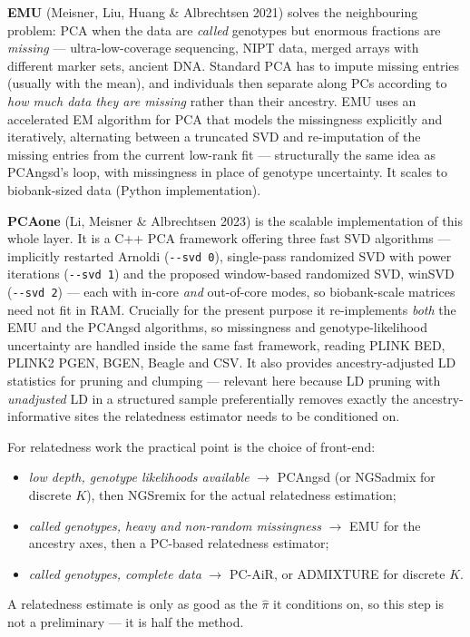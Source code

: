 \documentclass[10pt,a4paper]{article}
\newenvironment{tightitem}{%
  \begin{itemize}\setlength{\itemsep}{1pt}\setlength{\parskip}{0pt}%
  \setlength{\topsep}{3pt}\setlength{\parsep}{0pt}}{\end{itemize}}
\begin{document}
\textbf{EMU} (Meisner, Liu, Huang \& Albrechtsen 2021) solves the neighbouring problem: PCA when the data are
\emph{called} genotypes but enormous fractions are \emph{missing} --- ultra-low-coverage sequencing, NIPT
data, merged arrays with different marker sets, ancient DNA. Standard PCA has to impute missing entries
(usually with the mean), and individuals then separate along PCs according to \emph{how much data they are
missing} rather than their ancestry. EMU uses an accelerated EM algorithm for PCA that models the
missingness explicitly and iteratively, alternating between a truncated SVD and re-imputation of the missing
entries from the current low-rank fit --- structurally the same idea as PCAngsd's loop, with missingness in
place of genotype uncertainty. It scales to biobank-sized data (Python implementation).

\textbf{PCAone} (Li, Meisner \& Albrechtsen 2023) is the scalable implementation of this whole layer. It is a
C++ PCA framework offering three fast SVD algorithms --- implicitly restarted Arnoldi (\texttt{-{}-svd 0}),
single-pass randomized SVD with power iterations (\texttt{-{}-svd 1}) and the proposed window-based
randomized SVD, winSVD (\texttt{-{}-svd 2}) --- each with in-core \emph{and} out-of-core modes, so biobank-scale
matrices need not fit in RAM. Crucially for the present purpose it re-implements \emph{both} the EMU and the
PCAngsd algorithms, so missingness and genotype-likelihood uncertainty are handled inside the same fast
framework, reading PLINK BED, PLINK2 PGEN, BGEN, Beagle and CSV. It also provides ancestry-adjusted LD
statistics for pruning and clumping --- relevant here because LD pruning with \emph{unadjusted} LD in a
structured sample preferentially removes exactly the ancestry-informative sites the relatedness estimator
needs to be conditioned on.

For relatedness work the practical point is the choice of front-end:
\begin{tightitem}
  \item \emph{low depth, genotype likelihoods available} $\rightarrow$ PCAngsd (or NGSadmix for discrete $K$),
  then NGSremix for the actual relatedness estimation;
  \item \emph{called genotypes, heavy and non-random missingness} $\rightarrow$ EMU for the ancestry axes,
  then a PC-based relatedness estimator;
  \item \emph{called genotypes, complete data} $\rightarrow$ PC-AiR, or ADMIXTURE for discrete $K$.
\end{tightitem}
A relatedness estimate is only as good as the $\hat\pi$ it conditions on, so this step is not a preliminary
--- it is half the method.
\end{document}
